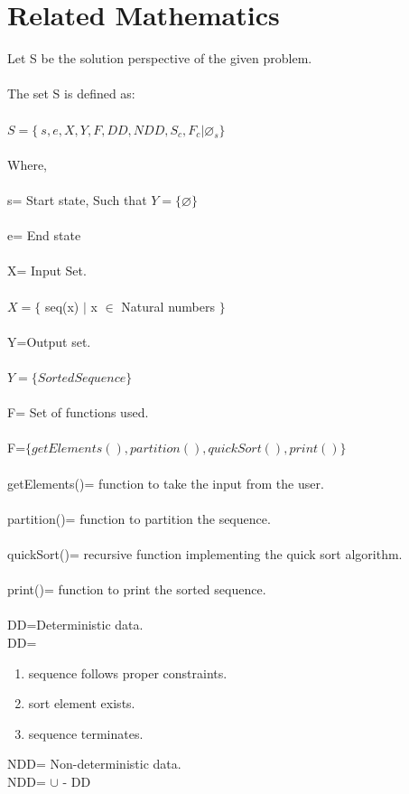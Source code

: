 \documentclass[10pt,a4paper]{article}
\begin{document}
\section{Related Mathematics}
Let S be the solution perspective of the given problem.
\\\\The set S is defined as:
\\\\$S=\lbrace\ s,e,X,Y,F,DD,NDD,S_{c},F_{c}|\varnothing_{s}\rbrace$
\\\\Where,
\\\\s= Start state,  Such that $Y=\lbrace \varnothing \rbrace$ 
\\\\e= End state 
\\\\X= Input Set.
\\\\$X=\lbrace$ seq(x) $\mid$ x $\in$ Natural numbers $\rbrace$
\\\\Y=Output set.
\\\\$Y=\lbrace Sorted Sequence \rbrace $
\\\\F= Set of functions used.
\\\\F=$\lbrace getElements(), partition(), quickSort(), print() \rbrace$
\\\\getElements()= function to take the input from the user.
\\\\partition()= function to partition the sequence.
\\\\quickSort()= recursive function implementing the quick sort algorithm.
\\\\print()= function to print the sorted sequence.
\\\\DD=Deterministic data.
\\DD=
\begin{enumerate}
\item sequence follows proper constraints.
\item sort element exists.
\item sequence terminates.
\end{enumerate}
NDD= Non-deterministic data.
\\NDD= $\cup$ - DD
\end{document}
